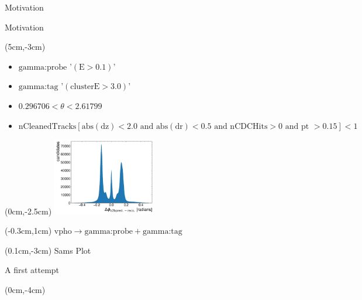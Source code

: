 \documentclass[10pt]{beamer}
\begin{document}
{\begin{frame}{Motivation}
	\end{frame}
	

	
	
\begin{frame}{Motivation}
	\begin{textblock*}{0.5\textwidth}(5cm,-3cm)
		

	
	
	\begin{itemize}
		
		\item $\textrm{gamma:probe}$ '$(\textrm{E} > 0.1 )$'
		\item $\textrm{gamma:tag}$ '$(\textrm{clusterE} > 3.0)$'

			\item $0.296706 < \theta < 2.61799 $
			\item $\textrm{nCleanedTracks}[ \textrm{abs}(\textrm{dz}) < 2.0 \textrm{ and } \textrm{abs}(\textrm{dr}) < 0.5 \textrm{ and nCDCHits} > 0 \textrm{ and pt } > 0.15] < 1  $
						
		\end{itemize}

	\end{textblock*}

	
\begin{textblock*}{0.5\textwidth}(0cm,-2.5cm)
	\includegraphics[width=4.5cm]{Plots/deltaPhiSam}
\end{textblock*}

\begin{textblock*}{0.5\textwidth}(-0.3cm,1cm)
	$\textrm{vpho} \rightarrow \textrm{gamma:probe} + \textrm{gamma:tag}$
\end{textblock*}

\begin{textblock*}{0.5\textwidth}(0.1cm,-3cm)
	Sams Plot
\end{textblock*}


	
\end{frame}

\begin{frame}{A first attempt}
	\begin{textblock*}{\textwidth}(0cm,-4cm)
	


\end{textblock*}
\end{frame}}
\end{document}
